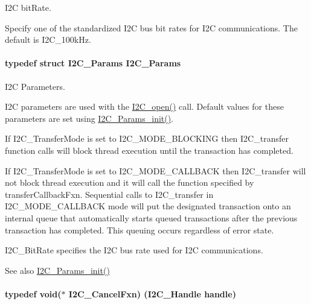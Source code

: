 I2\+C bit\+Rate. 

Specify one of the standardized I2\+C bus bit rates for I2\+C communications. The default is I2\+C\+\_\+100k\+Hz. 
\paragraph[{I2\+C\+\_\+\+Params}]{\setlength{\rightskip}{0pt plus 5cm}typedef struct {\bf I2\+C\+\_\+\+Params}  {\bf I2\+C\+\_\+\+Params}}\label{_i2_c_8h_ae6b2a2e3bc3716b5716ad6c1f10d7c1d}


I2\+C Parameters. 

I2\+C parameters are used with the \hyperlink{_i2_c_8h_ae1aa99e1fee4517406018e10025cca0e}{I2\+C\+\_\+open()} call. Default values for these parameters are set using \hyperlink{_i2_c_8h_ab11636302074d67180207ab81ceb323c}{I2\+C\+\_\+\+Params\+\_\+init()}.

If I2\+C\+\_\+\+Transfer\+Mode is set to I2\+C\+\_\+\+M\+O\+D\+E\+\_\+\+B\+L\+O\+C\+K\+I\+N\+G then I2\+C\+\_\+transfer function calls will block thread execution until the transaction has completed.

If I2\+C\+\_\+\+Transfer\+Mode is set to I2\+C\+\_\+\+M\+O\+D\+E\+\_\+\+C\+A\+L\+L\+B\+A\+C\+K then I2\+C\+\_\+transfer will not block thread execution and it will call the function specified by transfer\+Callback\+Fxn. Sequential calls to I2\+C\+\_\+transfer in I2\+C\+\_\+\+M\+O\+D\+E\+\_\+\+C\+A\+L\+L\+B\+A\+C\+K mode will put the designated transaction onto an internal queue that automatically starts queued transactions after the previous transaction has completed. This queuing occurs regardless of error state.

I2\+C\+\_\+\+Bit\+Rate specifies the I2\+C bus rate used for I2\+C communications.

\begin{DoxySeeAlso}{See also}
\hyperlink{_i2_c_8h_ab11636302074d67180207ab81ceb323c}{I2\+C\+\_\+\+Params\+\_\+init()} 
\end{DoxySeeAlso}
\paragraph[{I2\+C\+\_\+\+Cancel\+Fxn}]{\setlength{\rightskip}{0pt plus 5cm}typedef void($\ast$ I2\+C\+\_\+\+Cancel\+Fxn) ({\bf I2\+C\+\_\+\+Handle} handle)}\label{_i2_c_8h_a7a829a2a0fd594c50e93c3e55c7d04aa}


